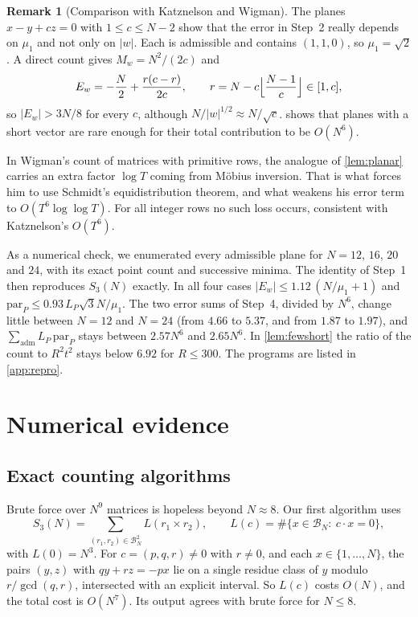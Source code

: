 \documentclass[11pt]{article}
\theoremstyle{definition}
\newtheorem{remark}[theorem]{Remark}
\newcommand{\BN}{\mathcal{B}_N}
\newcommand{\abs}[1]{\left\lvert #1 \right\rvert}
\begin{document}
\begin{remark}[Comparison with Katznelson and Wigman]
The planes $x-y+cz=0$ with $1\le c\le N-2$ show that the error in Step~2 really depends on $\mu_1$ and not only on $\abs w$. Each is admissible and contains $(1,1,0)$, so $\mu_1=\sqrt2$. A direct count gives $M_w=N^2/(2c)$ and
\[
E_w=-\frac N2+\frac{r(c-r)}{2c},\qquad r=N-c\Bigl\lfloor\frac{N-1}{c}\Bigr\rfloor\in[1,c],
\]
so $\abs{E_w}>3N/8$ for every $c$, although $N/\abs w^{1/2}\approx N/\sqrt c$.  shows that planes with a short vector are rare enough for their total contribution to be $O(N^6)$.

In Wigman's count of matrices with primitive rows, the analogue of \cref{lem:planar} carries an extra factor $\log T$ coming from Möbius inversion. That is what forces him to use Schmidt's equidistribution theorem, and what weakens his error term to $O(T^6\log\log T)$. For all integer rows no such loss occurs, consistent with Katznelson's $O(T^6)$.

As a numerical check, we enumerated every admissible plane for $N=12$, $16$, $20$ and $24$, with its exact point count and successive minima. The identity of Step~1 then reproduces $S_3(N)$ exactly. In all four cases $\abs{E_w}\le1.12\,(N/\mu_1+1)$ and $\mathrm{par}_P\le0.93\,L_P\sqrt3N/\mu_1$. The two error sums of Step~4, divided by $N^6$, change little between $N=12$ and $N=24$ (from $4.66$ to $5.37$, and from $1.87$ to $1.97$), and $\sum_{\text{adm}}L_P\,\mathrm{par}_P$ stays between $2.57N^6$ and $2.65N^6$. In \cref{lem:fewshort} the ratio of the count to $R^2t^2$ stays below $6.92$ for $R\le300$. The programs are listed in \cref{app:repro}.
\end{remark}

\section{Numerical evidence}\label{sec:numerics}

\subsection{Exact counting algorithms}

Brute force over $N^9$ matrices is hopeless beyond $N\approx 8$. Our first algorithm uses
\[
S_3(N)=\sum_{(r_1,r_2)\in\BN^2}L(r_1\times r_2),\qquad L(c)=\#\{x\in\BN:\ c\cdot x=0\},
\]
with $L(0)=N^3$. For $c=(p,q,r)\neq0$ with $r\ne0$, and each $x\in\{1,\dots,N\}$, the pairs $(y,z)$ with $qy+rz=-px$ lie on a single residue class of $y$ modulo $r/\gcd(q,r)$, intersected with an explicit interval. So $L(c)$ costs $O(N)$, and the total cost is $O(N^7)$. Its output agrees with brute force for $N\le 8$.
\end{document}
